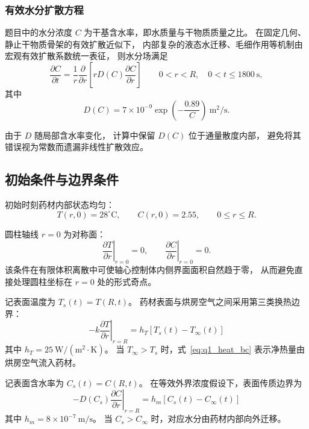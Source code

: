 \documentclass[UTF8,a4paper,12pt]{ctexart}
\begin{document}
\subsubsection{有效水分扩散方程}

题目中的水分浓度 $C$ 为干基含水率，即水质量与干物质质量之比。
在固定几何、静止干物质骨架的有效扩散近似下，
内部复杂的液态水迁移、毛细作用等机制由宏观有效扩散系数统一表征，
则水分场满足
\begin{equation}
\boxed{
\frac{\partial C}{\partial t}
=
\frac1r
\frac{\partial}{\partial r}
\left[
rD(C)
\frac{\partial C}{\partial r}
\right]
}
\qquad
0<r<R,\quad 0<t\le1800~\mathrm{s},
\label{eq:q1_mass}
\end{equation}
其中
\begin{equation}
D(C)
=
7\times10^{-9}
\exp\left(-\frac{0.89}{C}\right)
\ \mathrm{m^2/s}.
\end{equation}

由于 $D$ 随局部含水率变化，
计算中保留 $D(C)$ 位于通量散度内部，
避免将其错误视为常数而遗漏非线性扩散效应。

\subsection{初始条件与边界条件}

初始时刻药材内部状态均匀：
\begin{equation}
T(r,0)=28^\circ\mathrm C,
\qquad
C(r,0)=2.55,
\qquad
0\le r\le R.
\end{equation}

圆柱轴线 $r=0$ 为对称面：
\begin{equation}
\left.\frac{\partial T}{\partial r}\right|_{r=0}=0,
\qquad
\left.\frac{\partial C}{\partial r}\right|_{r=0}=0.
\label{eq:q1_axis}
\end{equation}
该条件在有限体积离散中可使轴心控制体内侧界面面积自然趋于零，
从而避免直接处理圆柱坐标在 $r=0$ 处的形式奇点。

记表面温度为 $T_s(t)=T(R,t)$。
药材表面与烘房空气之间采用第三类换热边界：
\begin{equation}
\boxed{
-k
\left.
\frac{\partial T}{\partial r}
\right|_{r=R}
=
h_T\left[T_s(t)-T_\infty(t)\right]
}
\label{eq:q1_heat_bc}
\end{equation}
其中 $h_T=25~\mathrm{W/(m^2\cdot K)}$。
当 $T_\infty>T_s$ 时，式~\eqref{eq:q1_heat_bc} 表示净热量由烘房空气流入药材。

记表面含水率为 $C_s(t)=C(R,t)$。
在等效外界浓度假设下，表面传质边界为
\begin{equation}
\boxed{
-D(C_s)
\left.
\frac{\partial C}{\partial r}
\right|_{r=R}
=
h_m\left[C_s(t)-C_\infty(t)\right]
}
\label{eq:q1_mass_bc}
\end{equation}
其中 $h_m=8\times10^{-7}~\mathrm{m/s}$。
当 $C_s>C_\infty$ 时，对应水分由药材内部向外迁移。
\end{document}
